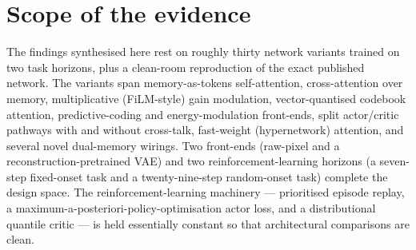 \section{Scope of the evidence}
The findings synthesised here rest on roughly thirty network variants trained on two task
horizons, plus a clean-room reproduction of the exact published network. The variants
span memory-as-tokens self-attention, cross-attention over memory, multiplicative
(FiLM-style) gain modulation, vector-quantised codebook attention, predictive-coding and
energy-modulation front-ends, split actor/critic pathways with and without cross-talk,
fast-weight (hypernetwork) attention, and several novel dual-memory wirings. Two
front-ends (raw-pixel and a reconstruction-pretrained VAE) and two reinforcement-learning
horizons (a seven-step fixed-onset task and a twenty-nine-step random-onset task) complete
the design space. The reinforcement-learning machinery --- prioritised episode replay, a
maximum-a-posteriori-policy-optimisation actor loss, and a distributional quantile critic
--- is held essentially constant so that architectural comparisons are clean.

